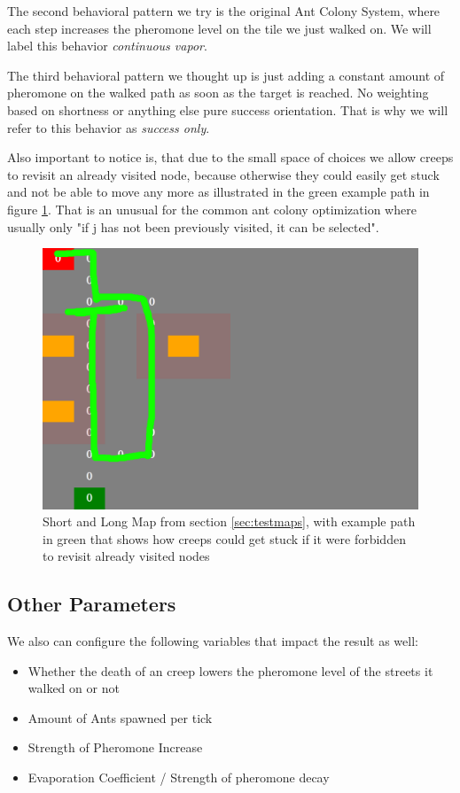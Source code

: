 The second behavioral pattern we try is the original Ant Colony System\cite{maniezzo2002ant}, where each step increases the pheromone level on the tile we just walked on. We will label this behavior \textit{continuous vapor}.

The third behavioral pattern we thought up is just adding a constant amount of pheromone on the walked path as soon as the target is reached. No weighting based on shortness or anything else pure success orientation. That is why we will refer to this behavior as \textit{success only}.

Also important to notice is, that due to the small space of choices we allow creeps to revisit an already visited node, because otherwise they could easily get stuck  and not be able to move any more as illustrated in the green example path in figure \ref{fig:gettingstuck}. That is an unusual for the common ant colony optimization where usually only "if j has  not  been  previously  visited,  it  can  be  selected"\cite{dorigo2006ant}.

\begin{figure}[H]
  \centering
  \includegraphics[width=1\linewidth]{images/map_shortlong_deadend}
  \caption{Short and Long Map from section \ref{sec:testmaps}, with example path in green that shows how creeps could get stuck if it were forbidden to revisit already visited nodes}
  \label{fig:gettingstuck}
\end{figure}

\subsection{Other Parameters}
\label{sec:otherparamas}
We also can configure the following variables that impact the result as well:
\begin{itemize}
\item  Whether the death of an creep lowers the pheromone level of the streets it walked on or not
\item Amount of Ants spawned per tick
\item Strength of Pheromone Increase
\item Evaporation Coefficient / Strength of pheromone decay
\end{itemize}


